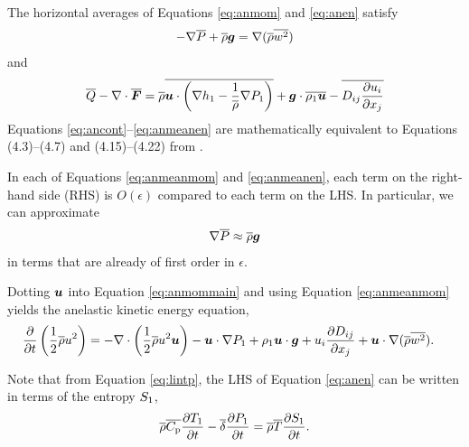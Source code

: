 \documentclass[12pt]{article}
\newcommand{\vecf}{\bm{F}}
\begin{document}
   The horizontal averages of Equations \eqref{eq:anmom} and \eqref{eq:anen} satisfy 
  \begin{align}\label{eq:anmeanmom}
  	-\nabla\overline{P} + \overline{\rho}\bm{g} = \nabla(\overline{\rho} \overline{w^2})
  \end{align}
  and
  \begin{align}\label{eq:anmeanen}
  	\heatover - \Div\overline{\vecf} = \rhoover\overline{\vecu\cdot\left(\nabla \enthone-\frac{1}{\rhoover}\nabla \prsone\right)} + \vecg\cdot\overline{\rhoone\vecu} - \overline{D_{ij}\pderiv{u_i}{x_j}}
  \end{align}
   Equations \eqref{eq:ancont}--\eqref{eq:anmeanen} are mathematically equivalent to Equations (4.3)--(4.7) and (4.15)--(4.22) from \citet{Gough1969}.
  
  In each of Equations \eqref{eq:anmeanmom} and \eqref{eq:anmeanen}, each term on the right-hand side (RHS) is $O(\epsilon)$ compared to each term on the LHS. In particular, we can approximate 
  \begin{align}\label{eq:anhydrostatic}
  	\nabla\overline{P}\approx \overline{\rho}\bm{g}
  \end{align}
  in terms that are already of first order in $\epsilon$. 
  
Dotting $\bm{u}$ into Equation \eqref{eq:anmommain} and using Equation \eqref{eq:anmeanmom} yields the anelastic kinetic energy equation,
	\begin{align}\label{eq:anke}
		\frac{\partial}{\partial t}\left(\frac{1}{2}\overline{\rho} u^2\right)&=-\nabla\cdot\left(\frac{1}{2}\overline{\rho} u^2\bm{u} \right) - \bm{u}\cdot\nabla P_1 + \rho_1\bm{u}\cdot\bm{g} + u_i\frac{\partial D_{ij}}{\partial x_j} + \bm{u}\cdot\nabla(\overline{\rho} \overline{w^2}).
	\end{align}

 Note that from Equation \eqref{eq:lintp}, the LHS of Equation \eqref{eq:anen} can be written in terms of the entropy $S_1$, 
\begin{align}\label{eq:anenlhs}
	\overline{\rho}\overline{C_{\rm{p}}}\frac{\partial T_1}{\partial t} - \overline{\delta}\frac{\partial P_1}{\partial t} = \overline{\rho}\overline{T}\frac{\partial S_1}{\partial t}.
\end{align}
\end{document}
